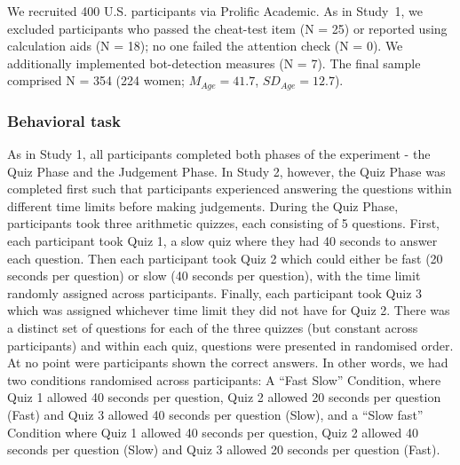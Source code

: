 \documentclass[10pt,letterpaper]{article}
\begin{document}
We recruited 400 U.S. participants via Prolific Academic. As in Study~1, we excluded participants who passed the cheat-test item (N = 25) or reported using calculation aids (N = 18); no one failed the attention check (N = 0). We additionally implemented bot-detection measures (N = 7). The final sample comprised N = 354 (224 women; \(M_{Age}=41.7\), \(SD_{Age}=12.7\)).

\subsubsection{Behavioral task}\label{behavioral-task-2}

As in Study 1, all participants completed both phases of the experiment - the Quiz Phase and the Judgement Phase. In Study 2, however, the Quiz Phase was completed first such that participants experienced answering the questions within different time limits before making judgements. 
During the Quiz Phase, participants took three arithmetic quizzes, each consisting of 5 questions. First, each participant took Quiz 1, a slow quiz where they had 40 seconds to answer each question. Then each participant took Quiz 2 which could either be fast (20 seconds per question) or slow (40 seconds per question), with the time limit randomly assigned across participants. Finally,  each participant took Quiz 3 which was assigned whichever time limit they did not have for Quiz 2. There was a distinct set of questions for each of the three quizzes (but constant across participants) and within each quiz, questions were presented in randomised order. At no point were participants shown the correct answers.
In other words, we had two conditions randomised across participants: A “Fast Slow” Condition, where Quiz 1 allowed 40 seconds per question, Quiz 2 allowed 20 seconds per question (Fast) and Quiz 3 allowed 40 seconds per question (Slow), and a “Slow fast” Condition where Quiz 1 allowed 40 seconds per question, Quiz 2  allowed 40 seconds per question (Slow) and Quiz 3 allowed 20 seconds per question (Fast).
\end{document}
